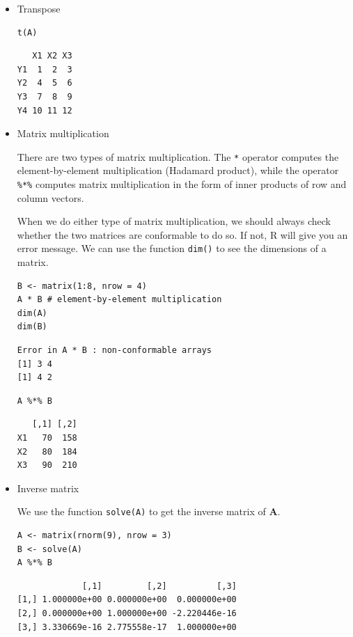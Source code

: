 \documentclass[a4paper,11pt]{article}
\begin{document}
\begin{itemize}
\item Transpose
\label{sec:org6714e0b}

\begin{verbatim}
t(A)
\end{verbatim}

\begin{verbatim}
   X1 X2 X3
Y1  1  2  3
Y2  4  5  6
Y3  7  8  9
Y4 10 11 12
\end{verbatim}

\item Matrix multiplication
\label{sec:org1e3d403}

There are two types of matrix multiplication. The \texttt{*} operator
computes the element-by-element multiplication (Hadamard product),
while the operator \texttt{\%*\%} computes matrix multiplication in the form of
inner products of row and column vectors.

When we do either type of matrix multiplication, we should always
check whether the two matrices are conformable to do so. If not, R
will give you an error message. We can use the function \texttt{dim()} to see
the dimensions of a matrix.

\begin{verbatim}
B <- matrix(1:8, nrow = 4)
A * B # element-by-element multiplication
dim(A)
dim(B)
\end{verbatim}

\begin{verbatim}
Error in A * B : non-conformable arrays
[1] 3 4
[1] 4 2
\end{verbatim}

\begin{verbatim}
A %*% B
\end{verbatim}

\begin{verbatim}
   [,1] [,2]
X1   70  158
X2   80  184
X3   90  210
\end{verbatim}

\item Inverse matrix
\label{sec:orgde5d808}

We use the function \texttt{solve(A)} to get the inverse matrix of
\(\mathbf{A}\).

\begin{verbatim}
A <- matrix(rnorm(9), nrow = 3)
B <- solve(A)
A %*% B
\end{verbatim}

\begin{verbatim}
             [,1]         [,2]          [,3]
[1,] 1.000000e+00 0.000000e+00  0.000000e+00
[2,] 0.000000e+00 1.000000e+00 -2.220446e-16
[3,] 3.330669e-16 2.775558e-17  1.000000e+00
\end{verbatim}


\end{itemize}
\end{document}
